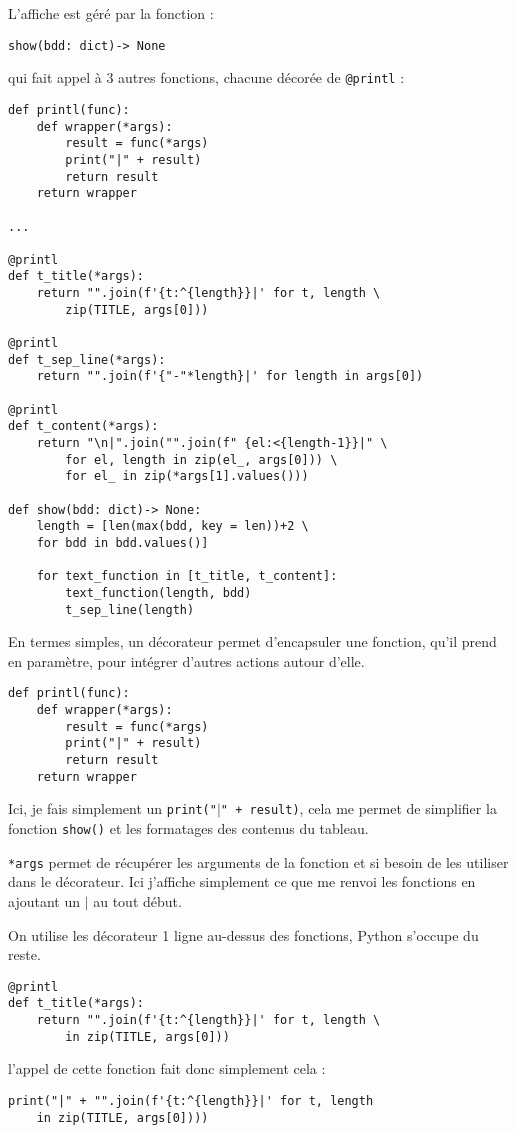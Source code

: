 \documentclass[a4paper,12pt]{article}
\begin{document}
L'affiche est géré par la fonction :
\begin{verbatim}
show(bdd: dict)-> None
\end{verbatim}
qui fait appel à 3 autres fonctions, chacune décorée de \texttt{@printl} :
\begin{lstlisting}
def printl(func):
    def wrapper(*args):
        result = func(*args)
        print("|" + result)
        return result
    return wrapper

...

@printl
def t_title(*args):
    return "".join(f'{t:^{length}}|' for t, length \
    	zip(TITLE, args[0]))

@printl
def t_sep_line(*args):
    return "".join(f'{"-"*length}|' for length in args[0])

@printl
def t_content(*args):
    return "\n|".join("".join(f" {el:<{length-1}}|" \ 
    	for el, length in zip(el_, args[0])) \ 
    	for el_ in zip(*args[1].values()))

def show(bdd: dict)-> None:
    length = [len(max(bdd, key = len))+2 \ 
    for bdd in bdd.values()]

    for text_function in [t_title, t_content]:
        text_function(length, bdd)
        t_sep_line(length)
\end{lstlisting}
\medskip

En termes simples, un décorateur permet d'encapsuler une fonction, qu'il prend en paramètre, pour intégrer d'autres actions autour d'elle.
\begin{lstlisting}
def printl(func):
    def wrapper(*args):
        result = func(*args)
        print("|" + result)
        return result
    return wrapper
\end{lstlisting}
\medskip

Ici, je fais simplement un \texttt{print("$|$" + result)}, cela me permet de simplifier la fonction \texttt{show()} et les formatages des contenus du tableau.
\medskip

\texttt{*args} permet de récupérer les arguments de la fonction et si besoin de les utiliser dans le décorateur. Ici j'affiche simplement ce que me renvoi les fonctions en ajoutant un \og \texttt{$|$}\fg{} au tout début.
\medskip

On utilise les décorateur 1 ligne au-dessus des fonctions, Python s'occupe du reste.
\begin{lstlisting}
@printl
def t_title(*args):
    return "".join(f'{t:^{length}}|' for t, length \
    	in zip(TITLE, args[0]))
\end{lstlisting}
l'appel de cette fonction fait donc simplement cela :
\begin{verbatim}
print("|" + "".join(f'{t:^{length}}|' for t, length 
    in zip(TITLE, args[0])))
\end{verbatim}
\medskip
\end{document}
